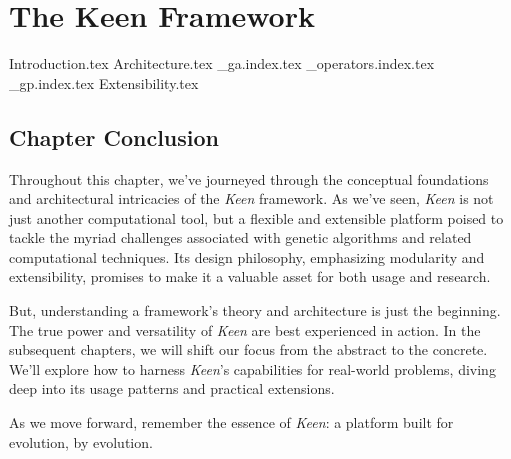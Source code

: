 
\chapter{The Keen Framework}
\label{chap:keen}
  {Introduction.tex}
  {Architecture.tex}
  {_ga.index.tex}
  {_operators.index.tex}
  {_gp.index.tex}
  {Extensibility.tex}

  \section{Chapter Conclusion}
  \label{sec:keen:conclusion}
    Throughout this chapter, we've journeyed through the conceptual foundations 
    and architectural intricacies of the \textit{Keen} framework. As we've seen, 
    \textit{Keen} is not just another computational tool, but a flexible and 
    extensible platform poised to tackle the myriad challenges associated with 
    genetic algorithms and related computational techniques. Its design 
    philosophy, emphasizing modularity and extensibility, promises to make it a 
    valuable asset for both usage and research.

    But, understanding a framework's theory and architecture is just the 
    beginning. The true power and versatility of \textit{Keen} are best 
    experienced in action. In the subsequent chapters, we will shift our focus 
    from the abstract to the concrete. We'll explore how to harness 
    \textit{Keen}'s capabilities for real-world problems, diving deep into its 
    usage patterns and practical extensions.

    As we move forward, remember the essence of \textit{Keen}: a platform built 
    for evolution, by evolution.